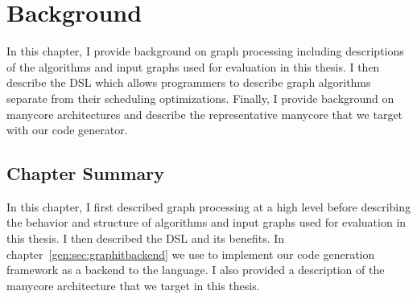 \chapter{Background}\label{gen:sec:background}

In this chapter, I provide background on graph processing including descriptions of the algorithms and input graphs used for evaluation in this thesis.
I then describe the \graphit DSL which allows programmers to describe graph algorithms separate from their scheduling optimizations.
Finally, I provide background on manycore architectures and describe the representative manycore that we target with our code generator. 

%





\section{Chapter Summary}
In this chapter, I first described graph processing at a high level before describing the behavior and structure of algorithms and input graphs used for evaluation in this thesis.
I then described the \graphit DSL and its benefits.
In chapter~\ref{gen:sec:graphitbackend} we use \graphit to implement our code generation framework as a backend to the language.
I also provided a description of the manycore architecture that we target in this thesis.